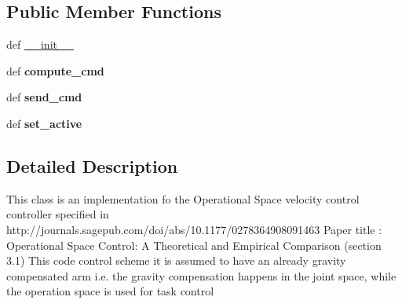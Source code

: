 \subsection*{Public Member Functions}
\begin{DoxyCompactItemize}
\item 
def \hyperlink{classaml__ctrl_1_1controllers_1_1os__controllers_1_1os__velocity__controller_1_1_o_s_velocity_controller_a2fb1750695088e028a61aa6b06006b7e}{\-\_\-\-\_\-init\-\_\-\-\_\-}
\item 
\hypertarget{classaml__ctrl_1_1controllers_1_1os__controllers_1_1os__velocity__controller_1_1_o_s_velocity_controller_a258538858a45d152856b74c978b77b24}{def {\bfseries compute\-\_\-cmd}}\label{classaml__ctrl_1_1controllers_1_1os__controllers_1_1os__velocity__controller_1_1_o_s_velocity_controller_a258538858a45d152856b74c978b77b24}

\item 
\hypertarget{classaml__ctrl_1_1controllers_1_1os__controllers_1_1os__velocity__controller_1_1_o_s_velocity_controller_a972ac1575f218b3c77d144190d4daf13}{def {\bfseries send\-\_\-cmd}}\label{classaml__ctrl_1_1controllers_1_1os__controllers_1_1os__velocity__controller_1_1_o_s_velocity_controller_a972ac1575f218b3c77d144190d4daf13}

\item 
\hypertarget{classaml__ctrl_1_1controllers_1_1os__controllers_1_1os__velocity__controller_1_1_o_s_velocity_controller_ac09e229dbbb04fcb80f4d8b8e12cb2e8}{def {\bfseries set\-\_\-active}}\label{classaml__ctrl_1_1controllers_1_1os__controllers_1_1os__velocity__controller_1_1_o_s_velocity_controller_ac09e229dbbb04fcb80f4d8b8e12cb2e8}

\end{DoxyCompactItemize}


\subsection{Detailed Description}
\begin{DoxyVerb}This class is an implementation fo the Operational Space velocity control 
controller specified in http://journals.sagepub.com/doi/abs/10.1177/0278364908091463
Paper title : Operational Space Control: A Theoretical and Empirical Comparison (section 3.1)
This code control scheme it is assumed to have an already gravity compensated arm
i.e. the gravity compensation happens in the joint space, while the operation space is used for task control
\end{DoxyVerb}
 

